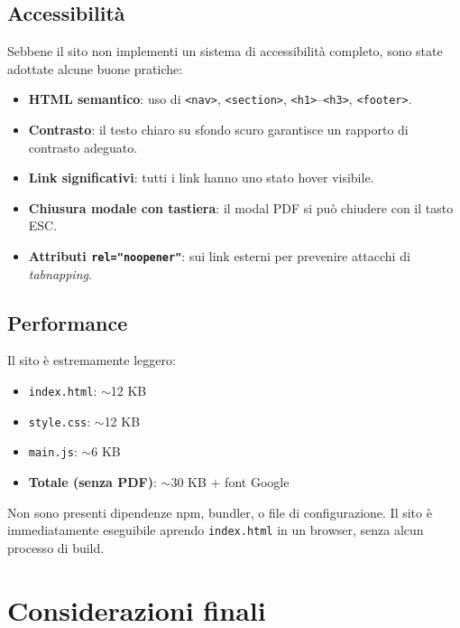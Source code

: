 \documentclass[a4paper,12pt]{report}
\begin{document}
\section{Accessibilit\`a}

Sebbene il sito non implementi un sistema di accessibilit\`a completo, sono state adottate alcune buone pratiche:

\begin{itemize}[leftmargin=2cm]
    \item \textbf{HTML semantico}: uso di \texttt{<nav>}, \texttt{<section>}, \texttt{<h1>}--\texttt{<h3>}, \texttt{<footer>}.
    \item \textbf{Contrasto}: il testo chiaro su sfondo scuro garantisce un rapporto di contrasto adeguato.
    \item \textbf{Link significativi}: tutti i link hanno uno stato hover visibile.
    \item \textbf{Chiusura modale con tastiera}: il modal PDF si pu\`o chiudere con il tasto ESC.
    \item \textbf{Attributi \texttt{rel="noopener"}}: sui link esterni per prevenire attacchi di \textit{tabnapping}.
\end{itemize}

\section{Performance}

Il sito \`e estremamente leggero:
\begin{itemize}[leftmargin=2cm]
    \item \texttt{index.html}: $\sim$12 KB
    \item \texttt{style.css}: $\sim$12 KB
    \item \texttt{main.js}: $\sim$6 KB
    \item \textbf{Totale (senza PDF)}: $\sim$30 KB + font Google
\end{itemize}

Non sono presenti dipendenze npm, bundler, o file di configurazione. Il sito \`e immediatamente eseguibile aprendo \texttt{index.html} in un browser, senza alcun processo di build.


\chapter{Considerazioni finali}
\end{document}
